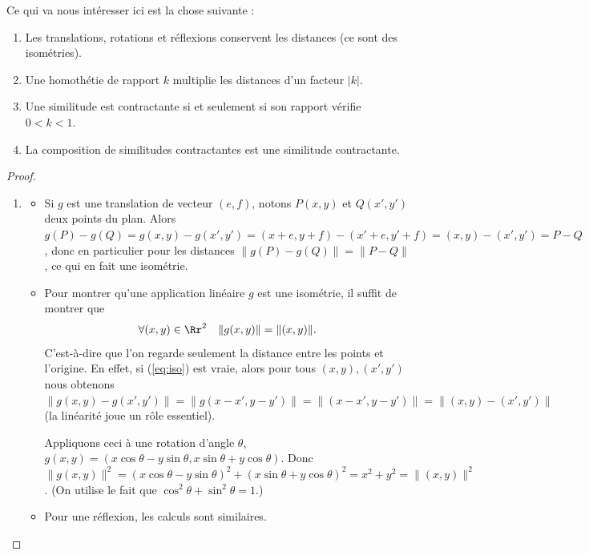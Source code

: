 \documentclass[11pt,class=report,crop=false]{standalone}
\begin{document}
Ce qui va nous intéresser ici est la chose suivante :
\begin{proposition}
\sauteligne
\begin{enumerate}
 \item Les translations, rotations et réflexions conservent les distances (ce sont des isométries).
 \item Une homothétie de rapport $k$ multiplie les distances d'un facteur $|k|$.
 \item Une similitude est contractante si et seulement si son rapport 
vérifie $0 < k < 1$.
 \item La composition de similitudes contractantes est une similitude contractante.
\end{enumerate}
\end{proposition}

\begin{proof}~
\begin{enumerate}
 \item \begin{itemize}
        \item Si $g$ est une translation de vecteur $(e,f)$, notons $P(x,y)$ et $Q(x',y')$ deux points du plan.
Alors $g(P)-g(Q)=g(x,y)-g(x',y') = (x+e,y+f)-(x'+e,y'+f)=(x,y)-(x',y')=P-Q$,
donc en particulier  pour les distances $\|g(P)-g(Q)\| = \|P-Q\|$, ce qui en fait une isométrie.
  
        \item Pour montrer qu'une application linéaire $g$ est une isométrie, il suffit de montrer que 
\begin{equation}
\label{eq:iso}
\forall (x,y) \in \Rr^2 \quad \| g(x,y) \| = \| (x,y) \|.
\end{equation}
C'est-à-dire que l'on regarde seulement la distance entre les points et l'origine.
En effet, si (\ref{eq:iso}) est vraie, alors pour tous $(x,y), (x',y')$ nous obtenons
$\|g(x,y)-g(x',y')\| = \|g(x-x',y-y')\|=\|(x-x',y-y')\|=\|(x,y)-(x',y')\|$
(la linéarité joue un rôle essentiel).

Appliquons ceci à une rotation d'angle $\theta$,
$g(x,y)= (x \cos \theta - y \sin \theta,x\sin \theta + y \cos \theta)$.
Donc $\|g(x,y) \|^2 = (x \cos \theta - y \sin \theta)^2 + (x\sin \theta + y \cos \theta)^2=
x^2+y^2= \| (x,y) \|^2$. (On utilise le fait que $\cos^2\theta + \sin^2\theta=1$.)

        \item Pour une réflexion, les calculs sont similaires. 
       \end{itemize}



\end{enumerate}
\end{proof}
\end{document}
